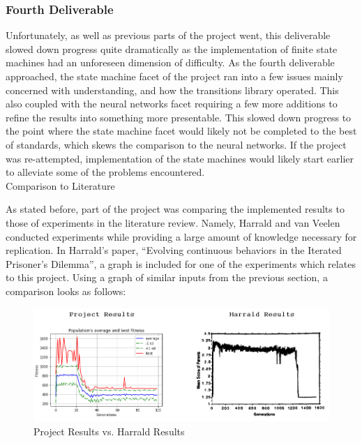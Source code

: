 \documentclass[12pt,a4paper]{article}
\makeatletter
\renewcommand\subsection{\@startsection {subsection}{1}{2mm}
                               {3pt plus 2pt minus 1pt}
                               {3pt plus 0pt}
                               {\normalfont\bfseries}}
\makeatother
\begin{document}
\subsubsection{Fourth Deliverable}

Unfortunately, as well as previous parts of the project went, this deliverable slowed down progress quite dramatically as the implementation of finite state machines had an unforeseen dimension of difficulty. As the fourth deliverable approached, the state machine facet of the project ran into a few issues mainly concerned with understanding, and how the transitions library operated. This also coupled with the neural networks facet requiring a few more additions to refine the results into something more presentable. This slowed down progress to the point where the state machine facet would likely not be completed to the best of standards, which skews the comparison to the neural networks. If the project was re-attempted, implementation of the state machines would likely start earlier to alleviate some of the problems encountered. \\

\subsection{Comparison to Literature}

As stated before, part of the project was comparing the implemented results to those of experiments in the literature review. Namely, Harrald and van Veelen conducted experiments while providing a large amount of knowledge necessary for replication. In Harrald's paper, “Evolving continuous behaviors in the Iterated Prisoner's Dilemma”, a graph is included\cite[p.~142]{25} for one of the experiments which relates to this project. Using a graph of similar inputs from the previous section, a comparison looks as follows:

\begin{figure}[H]
	\centering
		\includegraphics[width=1.00\textwidth]{HarraldComparison}
		\caption{Project Results vs. Harrald Results\cite[p.~142]{25}}
\end{figure}
\end{document}
